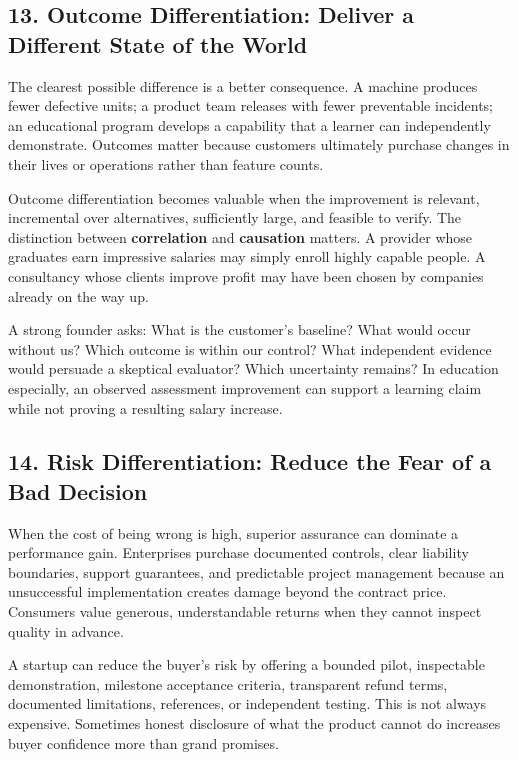 \subsection*{13. Outcome Differentiation: Deliver a Different State of the World}

The clearest possible difference is a better consequence. A machine produces fewer defective units; a product team releases with fewer preventable incidents; an educational program develops a capability that a learner can independently demonstrate. Outcomes matter because customers ultimately purchase changes in their lives or operations rather than feature counts.

Outcome differentiation becomes valuable when the improvement is relevant, incremental over alternatives, sufficiently large, and feasible to verify. The distinction between \textbf{correlation} and \textbf{causation} matters. A provider whose graduates earn impressive salaries may simply enroll highly capable people. A consultancy whose clients improve profit may have been chosen by companies already on the way up.

A strong founder asks: What is the customer's baseline? What would occur without us? Which outcome is within our control? What independent evidence would persuade a skeptical evaluator? Which uncertainty remains? In education especially, an observed assessment improvement can support a learning claim while not proving a resulting salary increase.

\subsection*{14. Risk Differentiation: Reduce the Fear of a Bad Decision}

When the cost of being wrong is high, superior assurance can dominate a performance gain. Enterprises purchase documented controls, clear liability boundaries, support guarantees, and predictable project management because an unsuccessful implementation creates damage beyond the contract price. Consumers value generous, understandable returns when they cannot inspect quality in advance.

A startup can reduce the buyer's risk by offering a bounded pilot, inspectable demonstration, milestone acceptance criteria, transparent refund terms, documented limitations, references, or independent testing. This is not always expensive. Sometimes honest disclosure of what the product cannot do increases buyer confidence more than grand promises.

